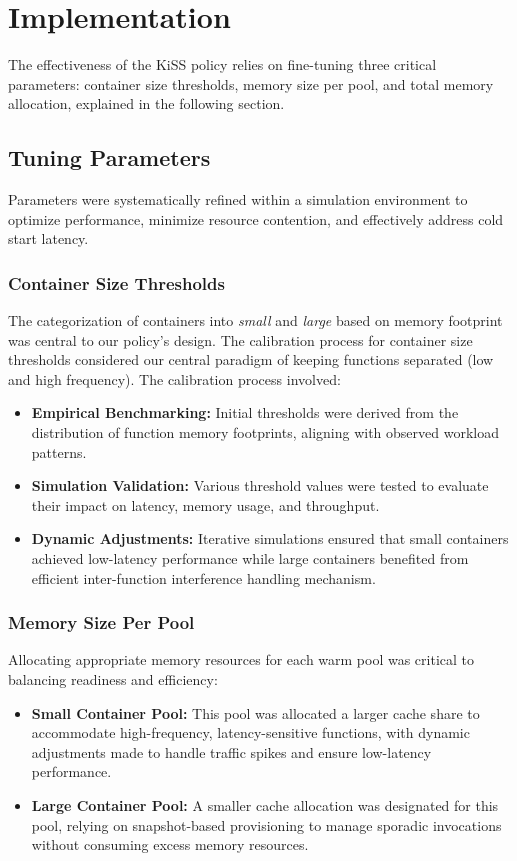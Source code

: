 \section{Implementation}\label{sec:implement}

The effectiveness of the KiSS policy relies on fine-tuning three critical parameters: container size thresholds, memory size per pool, and total memory allocation, explained in the following section. 

\subsection{Tuning Parameters}

Parameters were systematically refined within a simulation environment to optimize performance, minimize resource contention, and effectively address cold start latency.

\subsubsection{Container Size Thresholds}
The categorization of containers into \textit{small} and \textit{large} based on memory footprint was central to our policy's design. The calibration process for container size thresholds considered our central paradigm of keeping functions separated (low and high frequency). The calibration process involved:

\begin{itemize}
    \item \textbf{Empirical Benchmarking:} Initial thresholds were derived from the distribution of function memory footprints, aligning with observed workload patterns.
    \item \textbf{Simulation Validation:} Various threshold values were tested to evaluate their impact on latency, memory usage, and throughput.
    \item \textbf{Dynamic Adjustments:} Iterative simulations ensured that small containers achieved low-latency performance while large containers benefited from efficient inter-function interference handling mechanism.
\end{itemize}


\subsubsection{Memory Size Per Pool}
Allocating appropriate memory resources for each warm pool was critical to balancing readiness and efficiency:
\begin{itemize}
    \item \textbf{Small Container Pool:} This pool was allocated a larger cache share to accommodate high-frequency, latency-sensitive functions, with dynamic adjustments made to handle traffic spikes and ensure low-latency performance.
    \item \textbf{Large Container Pool:} A smaller cache allocation was designated for this pool, relying on snapshot-based provisioning to manage sporadic invocations without consuming excess memory resources.
\end{itemize}

